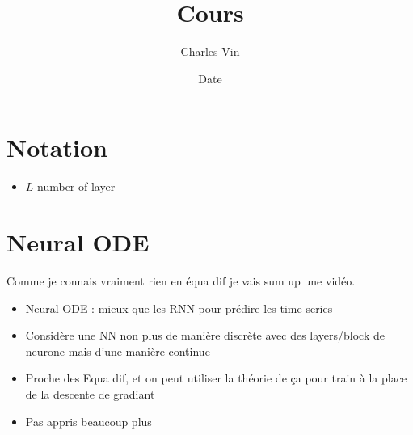 \documentclass{article}
\title{Cours}
\author{Charles Vin}
\date{Date}
\theoremstyle{plain}%
\theoremstyle{definition}
\theoremstyle{remark}
\begin{document}
\maketitle
\section{Notation}
\begin{itemize}
    \item $ L $ number of layer 
\end{itemize}
\section{Neural ODE}
Comme je connais vraiment rien en équa dif je vais sum up une vidéo. \begin{itemize}
    \item Neural ODE : mieux que les RNN pour prédire les time series
    \item Considère une NN non plus de manière discrète avec des layers/block de neurone mais d'une manière continue 
    \item Proche des Equa dif, et on peut utiliser la théorie de ça pour train à la place de la descente de gradiant 
    \item Pas appris beaucoup plus 
\end{itemize}
\end{document}
